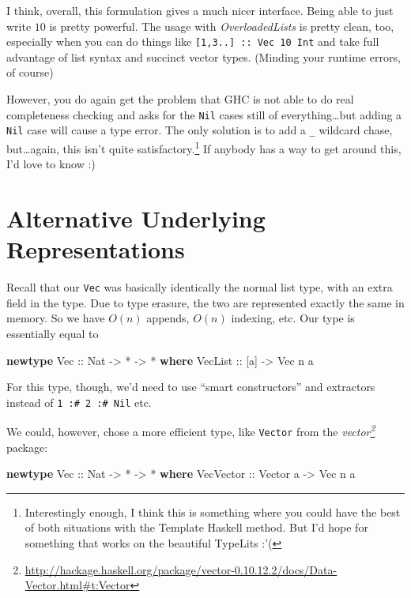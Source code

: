 \documentclass[]{article}
\newenvironment{Shaded}{}{}
\newcommand{\KeywordTok}[1]{\textcolor[rgb]{0.00,0.44,0.13}{\textbf{{#1}}}}
\newcommand{\DataTypeTok}[1]{\textcolor[rgb]{0.56,0.13,0.00}{{#1}}}
\newcommand{\OtherTok}[1]{\textcolor[rgb]{0.00,0.44,0.13}{{#1}}}
\newcommand{\FunctionTok}[1]{\textcolor[rgb]{0.02,0.16,0.49}{{#1}}}
\newcommand{\NormalTok}[1]{{#1}}
\renewcommand{\href}[2]{#2\footnote{\url{#1}}}
\begin{document}
I think, overall, this formulation gives a much nicer interface. Being
able to just write \(10\) is pretty powerful. The usage with
\emph{OverloadedLists} is pretty clean, too, especially when you can do
things like \texttt{{[}1,3..{]}\ ::\ Vec\ 10\ Int} and take full
advantage of list syntax and succinct vector types. (Minding your
runtime errors, of course)

However, you do again get the problem that GHC is not able to do real
completeness checking and asks for the \texttt{Nil} cases still of
everything\ldots{}but adding a \texttt{Nil} case will cause a type
error. The only solution is to add a \texttt{\_} wildcard chase,
but\ldots{}again, this isn't quite satisfactory.\footnote{Interestingly
  enough, I think this is something where you could have the best of
  both situations with the Template Haskell method. But I'd hope for
  something that works on the beautiful TypeLits :'(} If anybody has a
way to get around this, I'd love to know :)

\section{Alternative Underlying
Representations}\label{alternative-underlying-representations}

Recall that our \texttt{Vec} was basically identically the normal list
type, with an extra field in the type. Due to type erasure, the two are
represented exactly the same in memory. So we have \(O(n)\) appends,
\(O(n)\) indexing, etc. Our type is essentially equal to

\begin{Shaded}
\begin{Highlighting}[]
\KeywordTok{newtype} \DataTypeTok{Vec}\OtherTok{ ::} \DataTypeTok{Nat} \OtherTok{->} \FunctionTok{*} \OtherTok{->} \FunctionTok{*} \KeywordTok{where}
    \DataTypeTok{VecList}\OtherTok{ ::} \NormalTok{[a] }\OtherTok{->} \DataTypeTok{Vec} \NormalTok{n a}
\end{Highlighting}
\end{Shaded}

For this type, though, we'd need to use ``smart constructors'' and
extractors instead of \texttt{1\ :\#\ 2\ :\#\ Nil} etc.

We could, however, chose a more efficient type, like \texttt{Vector}
from the
\emph{\href{http://hackage.haskell.org/package/vector-0.10.12.2/docs/Data-Vector.html\#t:Vector}{vector}}
package:

\begin{Shaded}
\begin{Highlighting}[]
\KeywordTok{newtype} \DataTypeTok{Vec}\OtherTok{ ::} \DataTypeTok{Nat} \OtherTok{->} \FunctionTok{*} \OtherTok{->} \FunctionTok{*} \KeywordTok{where}
    \DataTypeTok{VecVector}\OtherTok{ ::} \DataTypeTok{Vector} \NormalTok{a }\OtherTok{->} \DataTypeTok{Vec} \NormalTok{n a}
\end{Highlighting}
\end{Shaded}
\end{document}
